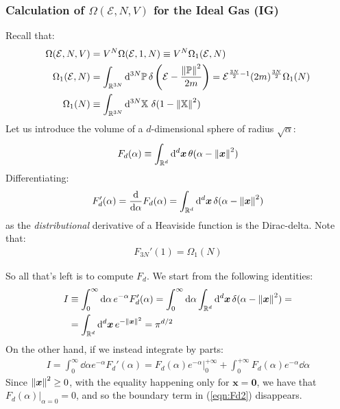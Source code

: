\documentclass[../../main.tex]{subfiles}
\begin{document}

\subsubsection{Calculation of $\Omega(\mathcal{E},N,V)$ for the Ideal Gas (IG)}
Recall that:
\begin{align} \label{eqn:omega-back}
    \Omega(\mathcal{E},N,V) &= V^N \Omega(\mathcal{E},1,N) \equiv V^N \Omega_1(\mathcal{E},N)\\ \nonumber
    \Omega_1(\mathcal{E},N) &= \int_{\mathbb{R}^{3N}} \dd[3N]{\mathbb{P}} \delta\left(\mathcal{E}-\frac{\norm{\mathbb{P}}^2}{2m} \right) = \mathcal{E}^{\frac{3N}{2}-1 } (2m)^{\frac{3N}{2}} \Omega_1(N) \\ \nonumber %
    \Omega_1(N) &\equiv \int_{\mathbb{R}^{3N}} \dd[3N]{\mathbb{X}}\, \delta(1-\norm{\mathbb{X}}^2) 
\end{align}
Let us introduce the volume of a $d$-dimensional sphere of radius $\sqrt{\alpha}$:
\begin{align*}
    F_d(\alpha) \equiv \int_{\mathbb{R}^d} \dd[d]{\bm{x}} \theta(\alpha - \norm{\bm{x}}^2)
\end{align*}
Differentiating:
\begin{align*}
    F_d'(\alpha) = \dv{\alpha} F_d(\alpha) = \int_{\mathbb{R}^d} \dd[d]{\bm{x}} \delta(\alpha - \norm{\bm{x}}^2)
\end{align*}
as the \textit{distributional} derivative of a Heaviside function is the Dirac-delta. Note that:
\begin{align}\label{eqn:omega-rel}
    F_{3N}'(1) = \Omega_1(N)
\end{align}

So all that's left is to compute $F_d$. We start from the following identities:
\begin{align*}
    I &\equiv \int_0^\infty \dd{\alpha} e^{-\alpha} F_d'(\alpha) = \int_0^{\infty} \dd{\alpha} \int_{\mathbb{R}^d} \dd[d]{\bm{x}} \delta(\alpha - \norm{\bm{x}}^2) =\\
    &= \int_{\mathbb{R}^d} \dd[d]{\bm{x}} e^{-\norm{\bm{x}}^2} = \pi^{d/2}
\end{align*}
On the other hand, if we instead integrate by parts:
\begin{align}\label{eqn:Fd2}
    I = \int_0^{\infty} \dd{\alpha} e^{-\alpha} F_d'(\alpha) = F_d(\alpha) e^{-\alpha} \Big|_0^{+\infty} + \int_0^{+\infty} F_d(\alpha) e^{-\alpha} \dd{\alpha}
\end{align}
Since $\norm{\bm{x}}^2 \geq 0$, with the equality happening only for $\bm{x} = \bm{0}$, we have that $F_d(\alpha)\Big|_{\alpha = 0} = 0$, and so the boundary term in (\ref{eqn:Fd2}) disappears.
\end{document}
